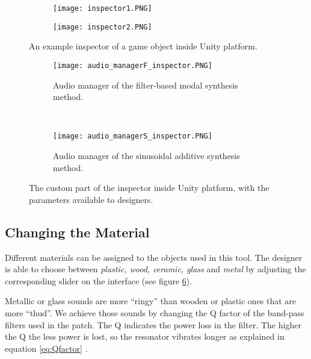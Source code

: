 \begin{figure}[H]
    \centering
    \begin{subfigure}[b]{0.45\textwidth}
        \texttt{[image: inspector1.PNG]}
        \label{fig:FB}
    \end{subfigure}
    \vspace{-0.6cm}%
      
\hspace{-4pt}\begin{subfigure}[b]{0.45\textwidth}
        \texttt{[image: inspector2.PNG]}
        \label{fig:sin}
    \end{subfigure}
    \caption{An example inspector of a game object inside Unity\textsuperscript{\textregistered} platform.}\label{fig:audio_insp}
\end{figure}


\begin{figure}[H]
    \centering
    \begin{subfigure}[b]{0.45\textwidth}
        \texttt{[image: audio\_managerF\_inspector.PNG]}
        \caption{Audio manager of the filter-based modal synthesis method.}
        \label{fig:FB}
    \end{subfigure}
    ~ %
    \begin{subfigure}[b]{0.45\textwidth}
        \texttt{[image: audio\_managerS\_inspector.PNG]}
        \caption{Audio manager of the sinusoidal additive synthesis method.}
        \label{fig:sin}
    \end{subfigure}
    \caption{The custom part of the inspector inside Unity\textsuperscript{\textregistered} platform, with the parameters available to designers.}\label{fig:custom_insp}
\end{figure}

\subsection{Changing the Material}
Different materials can be assigned to the objects used in this tool. The designer is able to choose between \textit{plastic, wood, ceramic, glass} and \textit{metal} by adjusting the corresponding slider on the interface (see figure \ref{fig:custom_insp}). 

Metallic or glass sounds are more ``ringy'' than wooden or plastic ones that are more ``thud''. We achieve those sounds by changing the \gls{Q} factor of the band-pass filters used in the  patch. The \gls{Q} indicates the power loss in the filter. The higher the \gls{Q} the less power is lost, so the resonator vibrates longer as explained in equation \ref{eq:Qfactor} \cite{bib:Q}.

